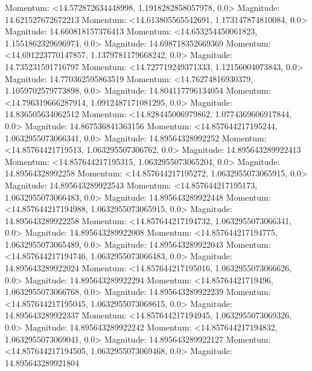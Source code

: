 \documentclass[10pt]{article}
\begin{document}
Momentum: <14.572872634448998, 1.1918282858057978, 0.0> Magnitude: 14.621527672672213
Momentum: <14.613805565542691, 1.173147874810084, 0.0> Magnitude: 14.660818157376413
Momentum: <14.653254450061823, 1.1551862329696974, 0.0> Magnitude: 14.698718352669369
Momentum: <14.691223770147857, 1.1379781179668242, 0.0> Magnitude: 14.735231591716797
Momentum: <14.727719249371333, 1.12156004073843, 0.0> Magnitude: 14.770362595863519
Momentum: <14.76274816930379, 1.1059702579773898, 0.0> Magnitude: 14.804117796134054
Momentum: <14.796319666287914, 1.0912487171081295, 0.0> Magnitude: 14.836505634062512
Momentum: <14.828445006979862, 1.0774369606917844, 0.0> Magnitude: 14.867536841363156
Momentum: <14.857644217195244, 1.0632955073066341, 0.0> Magnitude: 14.89564328992252
Momentum: <14.85764421719513, 1.063295507306762, 0.0> Magnitude: 14.895643289922413
Momentum: <14.857644217195315, 1.0632955073065204, 0.0> Magnitude: 14.89564328992258
Momentum: <14.857644217195272, 1.0632955073065915, 0.0> Magnitude: 14.895643289922543
Momentum: <14.857644217195173, 1.0632955073066483, 0.0> Magnitude: 14.895643289922448
Momentum: <14.857644217194988, 1.0632955073065915, 0.0> Magnitude: 14.895643289922258
Momentum: <14.857644217194732, 1.0632955073066341, 0.0> Magnitude: 14.895643289922008
Momentum: <14.857644217194775, 1.0632955073065489, 0.0> Magnitude: 14.895643289922043
Momentum: <14.857644217194746, 1.0632955073066483, 0.0> Magnitude: 14.895643289922024
Momentum: <14.857644217195016, 1.0632955073066626, 0.0> Magnitude: 14.895643289922294
Momentum: <14.85764421719496, 1.0632955073066768, 0.0> Magnitude: 14.895643289922239
Momentum: <14.857644217195045, 1.0632955073068615, 0.0> Magnitude: 14.895643289922337
Momentum: <14.857644217194945, 1.0632955073069326, 0.0> Magnitude: 14.895643289922242
Momentum: <14.857644217194832, 1.0632955073069041, 0.0> Magnitude: 14.895643289922127
Momentum: <14.857644217194505, 1.0632955073069468, 0.0> Magnitude: 14.895643289921804
\end{document}
